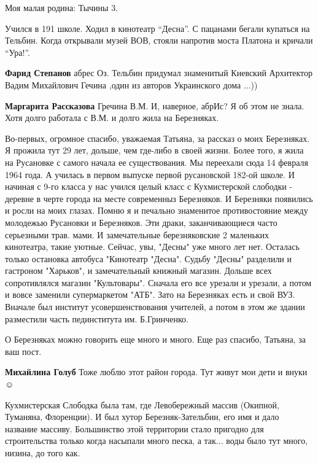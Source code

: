 \begin{itemize}

Моя малая родина: Тычины 3.

Учился в 191 школе. Ходил в кинотеатр \enquote{Десна}. С пацанами бегали купаться на
Тельбин. Когда открывали музей ВОВ, стояли напротив моста Платона и кричали
\enquote{Ура!}.

\begin{itemize} %
\textbf{Фарид Степанов} абрес Оз. Тельбин придумал знаменитый Киевский Архитектор Вадим Михайлович Гечина ,один из авторов Украинского дома ...))

\textbf{Маргарита Рассказова} Гречина В.М. И, наверное, абрИс? Я об этом не знала. Хотя долго работала с В.М. и долго жила на Березняках.
\end{itemize} %


Во-первых, огромное спасибо, уважаемая Татьяна, за рассказ о моих Березняках. Я
прожила тут 29 лет, дольше, чем где-либо в своей жизни. Более того, я жила на
Русановке с самого начала ее существования. Мы переехали сюда 14 февраля 1964
года. А училась в первом выпуске первой русановской 182-ой школе. И начиная с
9-го класса у нас учился целый класс с Кухмистерской слободки - деревне в черте
города на месте современныз Березняков. И Березняки появились и росли на моих
глазах. Помню я и печально знаменитое противостояние между молодежью Русановки
и Березняков. Эти драки, заканчивающиеся часто серьезными трав. мами.  И
замечательные березняковские 2 маленьких кинотеатра, такие уютные. Сейчас, увы,
"Десны" уже много лет нет. Осталась только остановка автобуса "Кинотеатр
"Десна". Судьбу "Десны" разделили и гастроном "Харьков", и замечательный
книжный магазин. Дольше всех сопротивлялся магазин "Культовары". Сначала его
все урезали и урезали, а потом и вовсе заменили супермаркетом "АТБ". Зато на
Березняках есть и свой ВУЗ. Вначале был институт усовершенствования учителей, а
потом в этом же здании разместили часть пединститута им. Б.Гринченко.

О Березняках можно говорить еще много и много. Еще раз спасибо, Татьяна, за ваш
пост.

\begin{itemize} %
\textbf{Михайлина Голуб} Тоже люблю этот район города. Тут живут мои дети и внуки ☺ ️ 


Кухмистерская Слободка была там, где Левобережный массив (Окипной, Туманяна,
Флоренции). И был хутор Березняк-Зательбин, его имя и дало название массиву.
Большинство этой территории стало пригодно для строительства только когда
насыпали много песка, а так... воды было тут много, низина, до того как.


\end{itemize}
\end{itemize}
